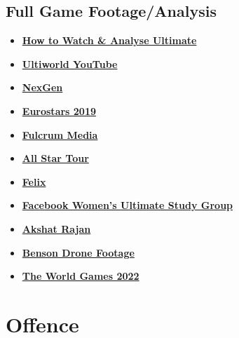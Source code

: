 \subsection*{Full Game Footage/Analysis}
\begin{itemize}
    \item \textcolor{blue}{\textbf{\href{https://ultiworld.com/2016/01/26/tuesday-tips-6-tips-watching-ultimate-learn/}{How to Watch \& Analyse Ultimate}}}
    \item \textcolor{blue}{\textbf{\href{https://www.youtube.com/user/ultiworld}{Ultiworld YouTube}}}
    \item \textcolor{blue}{\textbf{\href{https://www.youtube.com/user/ngnultimate}{NexGen}}}
    \item \textcolor{blue}{\textbf{\href{ https://www.youtube.com/watch?v=npFMAn2-fog&list=PLL-qDHd5o5ucNQtxrKvWGzl0TLYGxY9Hd}{Eurostars 2019}}}
    \item \textcolor{blue}{\textbf{\href{https://www.youtube.com/channel/UCV-aOrtNgW5716QNbcaFEOw/videos}{Fulcrum Media}}}
    \item \textcolor{blue}{\textbf{\href{https://www.youtube.com/channel/UCNfzLEjrWA2xVfXCTZRfg8w}{All Star Tour}}}
    \item \textcolor{blue}{\textbf{\href{https://www.youtube.com/channel/UCzI8gchZtzKsI7olyWI6bwQ}{Felix}}}
    \item \textcolor{blue}{\textbf{\href{https://www.facebook.com/groups/944712935656254/}{Facebook Women's Ultimate Study Group}}}
    \item \textcolor{blue}{\textbf{\href{https://www.youtube.com/user/TheRajanStudios/videos}{Akshat Rajan}}}
    \item \textcolor{blue}{\textbf{\href{https://vimeo.com/user95184899}{Benson Drone Footage}}}
     \item \textcolor{blue}{\textbf{\href{https://wfdf.sport/worldgames/}{The World Games 2022}}}
\end{itemize}


\section{Offence}
